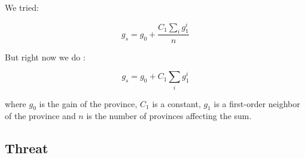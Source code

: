 \documentclass[a4paper]{article} %
\begin{document}
\begin{description}
We tried: 

$$ g_{s} = g_0 + \frac{ C_1 \sum_i g_1^i}{n}$$

But right now we do :

$$ g_{s} = g_0 + C_1 \sum_i g_1^i$$

where $g_0$ is the gain of the province, $C_1$ is a constant, $g_1$ is a first-order neighbor of the province and $n$ is the number of provinces affecting the sum. 

\subsection{Threat}


\end{description} 


{}
\end{document}
